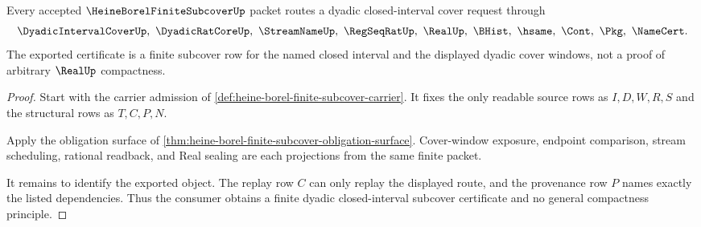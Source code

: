 \begin{theorem}
\label{thm:heine-borel-finite-subcover-namecert-route}
Every accepted $\HeineBorelFiniteSubcoverUp$ packet routes a dyadic closed-interval cover request through
$$
\DyadicIntervalCoverUp,\ \DyadicRatCoreUp,\ \StreamNameUp,\ \RegSeqRatUp,\ \RealUp,\ \BHist,\ \hsame,\ \Cont,\ \Pkg,\ \NameCert .
$$
The exported certificate is a finite subcover row for the named closed interval and the displayed dyadic cover windows, not a proof of arbitrary $\RealUp$ compactness.
\end{theorem}
\begin{proof}
Start with the carrier admission of \autoref{def:heine-borel-finite-subcover-carrier}. It fixes the only readable source rows as $I,D,W,R,S$ and the structural rows as $T,C,P,N$.

Apply the obligation surface of \autoref{thm:heine-borel-finite-subcover-obligation-surface}. Cover-window exposure, endpoint comparison, stream scheduling, rational readback, and Real sealing are each projections from the same finite packet.

It remains to identify the exported object. The replay row $C$ can only replay the displayed route, and the provenance row $P$ names exactly the listed dependencies. Thus the consumer obtains a finite dyadic closed-interval subcover certificate and no general compactness principle.
\end{proof}




